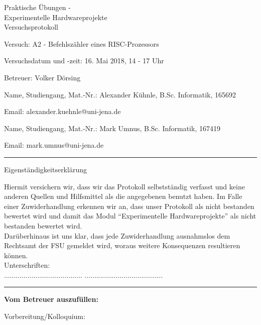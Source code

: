\documentclass[12pt,a4paper]{scrartcl}
\begin{document}
\thispagestyle{empty}

\begin{center}
  \LARGE
  Praktische \"Ubungen - \\
  Experimentelle Hardwareprojekte \\
  \bigskip
  \Large
  Versuchsprotokoll
\end{center}

\vspace{1em}
Versuch: A2 - Befehlsz\"ahler eines RISC-Prozessors

Versuchsdatum und -zeit: 16. Mai 2018, 14 - 17 Uhr

Betreuer: Volker D\"orsing

\vspace{1em}
Name, Studiengang, Mat.-Nr.: Alexander K\"uhnle, B.Sc. Informatik, 165692

Email: alexander.kuehnle@uni-jena.de

\vspace{1em}
Name, Studiengang, Mat.-Nr.: Mark Umnus, B.Sc. Informatik, 167419

Email: mark.umnus@uni-jena.de

\vspace*{1cm}
\hrule
\vspace*{1cm}
{\Large  Eigenst\"andigkeitserkl\"arung }

Hiermit versichern wir, dass wir das Protokoll selbstst\"andig verfasst
und keine anderen Quellen und Hilfsmittel als die angegebenen benutzt
haben. Im Falle einer Zuwiderhandlung erkennen wir an, dass unser Protokoll
als nicht bestanden bewertet wird und damit das Modul ``Experimentelle
Hardwareprojekte'' als nicht bestanden bewertet wird. \\
Dar\"uberhinaus ist uns klar, dass jede Zuwiderhandlung ausnahmslos dem
Rechtsamt der FSU gemeldet wird, woraus weitere Konsequenzen resultieren
k\"onnen. \\

Unterschriften: \\
\hspace*{4cm} ........................................
\hspace{2cm} ........................................  \\

\hrule

\vspace*{0.3cm}
\textbf{Vom Betreuer auszuf\"ullen:}

Vorbereitung/Kolloquium:
\end{document}
